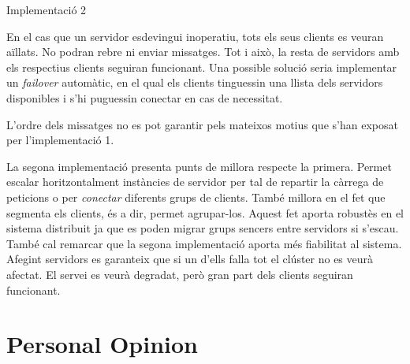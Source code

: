 \documentclass[a4paper, 11pt]{article}
\begin{document}
Implementació 2

En el cas que un servidor esdevingui inoperatiu, tots els seus clients es veuran aïllats. No podran rebre ni enviar missatges. Tot i això, la resta de servidors amb els respectius clients seguiran funcionant.
Una possible solució seria implementar un \textit{failover} autom\`atic, en el qual els clients tinguessin una llista dels servidors disponibles i s'hi puguessin conectar en cas de necessitat.

L'ordre dels missatges no es pot garantir pels mateixos motius que s'han exposat per l'implementació 1.

La segona implementació presenta punts de millora respecte la primera. Permet escalar horitzontalment instàncies de servidor per tal de repartir la càrrega de peticions o per \textit{conectar} diferents grups de clients. També millora en el fet que segmenta els clients, és a dir, permet agrupar-los. Aquest fet aporta robustès en el sistema distribuit ja que es poden migrar grups sencers entre servidors si s'escau. 
També cal remarcar que la segona implementació aporta més fiabilitat al sistema. Afegint servidors es garanteix que si un d'ells falla tot el clúster no es veurà afectat. El servei es veurà degradat, però gran part dels clients seguiran funcionant. 


\section{Personal Opinion}

\end{document}
